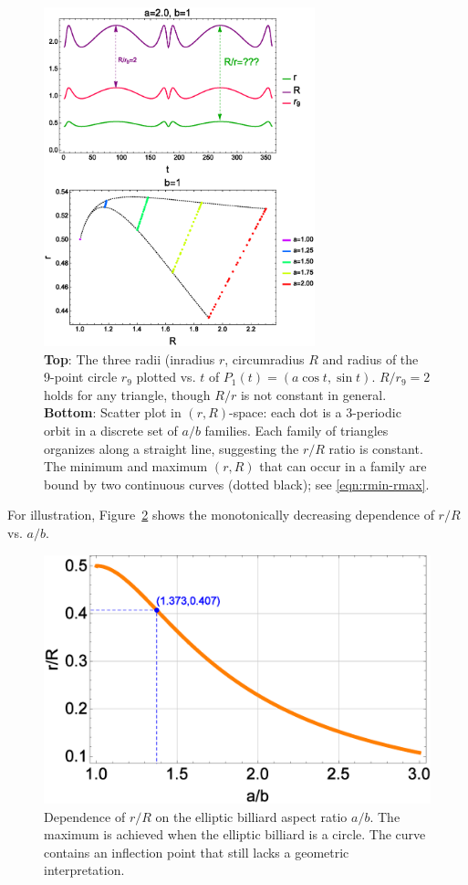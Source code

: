 \documentclass{amsart}
\theoremstyle{definition}
\begin{document}
\begin{figure}[H]
    \centering
    \includegraphics[width=0.70\textwidth]{1050_radii_grid2.eps}
    \caption{\textbf{Top}: The three radii (inradius $r$, circumradius $R$ and radius of the 9-point circle $r_9$ plotted vs. $t$ of $P_1(t)=(a \cos t,\sin t)$. $R/r_9=2$ holds for any triangle, though $R/r$ is not constant in general. \textbf{Bottom}: Scatter plot in $(r,R)$-space: each dot is a 3-periodic orbit in a discrete set of $a/b$ families. Each family of triangles organizes along a straight line, suggesting the $r/R$ ratio is constant. The minimum and maximum $(r,R)$ that can occur in a family are bound by two continuous curves (dotted black); see \eqref{eqn:rmin-rmax}.}
    \label{fig:radii-grid2}
\end{figure}

For illustration, Figure~\ref{fig:rovR-vs-ab} shows the monotonically decreasing dependence of $r/R$ vs. $a/b$.

\begin{figure}[H]
    \centering
    \includegraphics[width=.60\textwidth]{1030_rR_vs_ab.eps}
    \caption{Dependence of $r/R$ on the elliptic billiard aspect ratio $a/b$. The maximum is achieved when the elliptic billiard is a circle. The curve contains an inflection point that still lacks a geometric interpretation.}
    \label{fig:rovR-vs-ab}
\end{figure}
\end{document}

